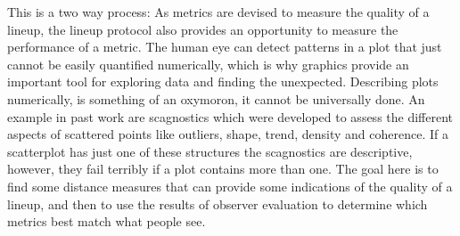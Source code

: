 \documentclass[12]{article}
\begin{document}




This is a two way process: As metrics are devised to measure the quality of a lineup, the lineup protocol also provides an opportunity to measure the performance of a metric. The human eye can detect patterns in a plot that just cannot be easily quantified numerically, which is why graphics provide an important tool for exploring data and finding the unexpected. Describing plots numerically, is something  of an oxymoron, it cannot be universally done. An example in past work are scagnostics \citep{tukey:1977,wilkinson2005graph} which were developed to assess the different aspects of scattered points like outliers, shape, trend, density and coherence.  If a scatterplot has just one of these structures the scagnostics are descriptive, however, they fail terribly if a plot contains more than one. The goal here is to find some distance measures that can provide some indications of the quality of a lineup, and then to use the results of observer evaluation to determine which metrics best match what people see.
\end{document}
